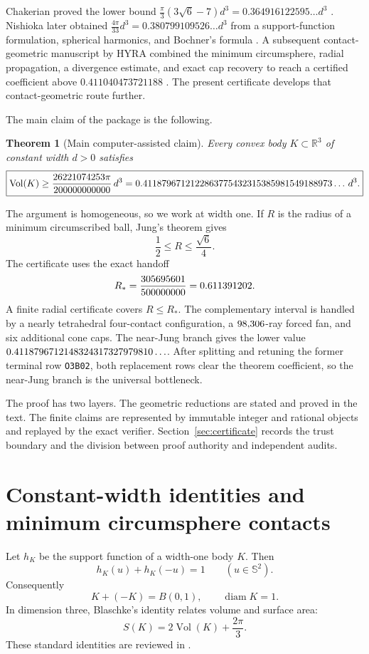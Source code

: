 \documentclass[11pt,reqno]{amsart}
\newtheorem{theorem}{Theorem}[section]
\theoremstyle{remark}
\newcommand{\R}{\mathbb R}
\newcommand{\Sph}{\mathbb S^2}
\newcommand{\Vol}{\operatorname{Vol}}
\newcommand{\diam}{\operatorname{diam}}
\begin{document}
Chakerian proved the lower bound
$\frac{\pi}{3}(3\sqrt6-7)d^3=0.364916122595\ldots d^3$
\cite{Chakerian1966}.  Nishioka later obtained
$\frac{4\pi}{33}d^3=0.380799109526\ldots d^3$ from a support-function
formulation, spherical harmonics, and Bochner's formula
\cite{Nishioka2026}.  A subsequent contact-geometric manuscript by HYRA
combined the minimum circumsphere, radial propagation, a divergence estimate,
and exact cap recovery to reach a certified coefficient above
$0.411040473721188$ \cite{HYRA2026}.  The present certificate develops that
contact-geometric route further.

The main claim of the package is the following.

\begin{theorem}[Main computer-assisted claim]\label{thm:main}
Every convex body $K\subset\R^3$ of constant width $d>0$ satisfies
\[
 \boxed{\Vol(K)\ge \MainCoefficient\,d^3
 =\MainDecimal\ldots\,d^3.}
\]
\end{theorem}

The argument is homogeneous, so we work at width one.  If $R$ is the radius of
a minimum circumscribed ball, Jung's theorem gives
\[
 \frac12\le R\le\frac{\sqrt6}{4}.
\]
The certificate uses the exact handoff
\[
 R_*=\frac{305695601}{500000000}=0.611391202.
\]
A finite radial certificate covers $R\le R_*$.  The complementary interval is
handled by a nearly tetrahedral four-contact configuration, a
$98{,}306$-ray forced fan, and six additional cone caps.  The near-Jung
branch gives the lower value
$0.4118796712148324317327979810\ldots$.  After splitting and retuning the former terminal row
\texttt{O3B02}, both replacement rows clear the theorem coefficient, so the
near-Jung branch is the universal bottleneck.

The proof has two layers.  The geometric reductions are stated and proved in
the text.  The finite claims are represented by immutable integer and rational
objects and replayed by the exact verifier.  Section~\ref{sec:certificate}
records the trust boundary and the division between proof authority and
independent audits.

\section{Constant-width identities and minimum circumsphere contacts}
\label{sec:prelim}

Let $h_K$ be the support function of a width-one body $K$.  Then
\begin{equation}\label{eq:width-support}
 h_K(u)+h_K(-u)=1\qquad(u\in\Sph).
\end{equation}
Consequently
\begin{equation}\label{eq:difference-body}
 K+(-K)=B(0,1),\qquad \diam K=1.
\end{equation}
In dimension three, Blaschke's identity relates volume and surface area:
\begin{equation}\label{eq:blaschke}
 S(K)=2\Vol(K)+\frac{2\pi}{3}.
\end{equation}
These standard identities are reviewed in
\cite{ChakerianGroemer1983,Martini2019,Schneider2014}.
\end{document}

